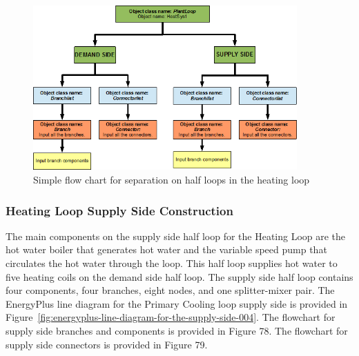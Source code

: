\begin{figure}[hbtp] %
\centering
\includegraphics[width=0.9\textwidth, height=0.9\textheight, keepaspectratio=true]{media/image076.png}
\caption{Simple flow chart for separation on half loops in the heating loop \protect \label{fig:simple-flow-chart-for-separation-on-half-002}}
\end{figure}

\subsubsection{Heating Loop Supply Side Construction}\label{heating-loop-supply-side-construction}

The main components on the supply side half loop for the Heating Loop are the hot water boiler that generates hot water and the variable speed pump that circulates the hot water through the loop. This half loop supplies hot water to five heating coils on the demand side half loop. The supply side half loop contains four components, four branches, eight nodes, and one splitter-mixer pair. The EnergyPlus line diagram for the Primary Cooling loop supply side is provided in Figure~\ref{fig:energyplus-line-diagram-for-the-supply-side-004}. The flowchart for supply side branches and components is provided in Figure 78. The flowchart for supply side connectors is provided in Figure 79.

